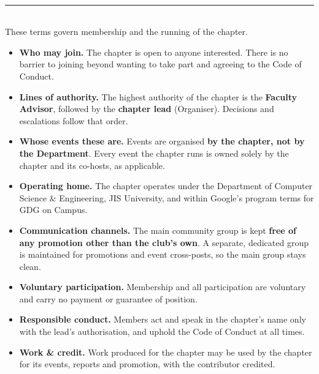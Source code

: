 \documentclass[11pt,a4paper]{article}
\newcommand{\pill}[2]{\tikz[baseline]{\node[fill=#1,text=white,font=\bfseries\small,%
  rounded corners=3pt,inner xsep=7pt,inner ysep=2.5pt]{#2};}}
\begin{document}
\begin{tcolorbox}[enhanced,breakable,colback=white,colframe=Line,boxrule=0.6pt,arc=5pt,
    left=14pt,right=14pt,top=12pt,bottom=12pt,borderline west={3.5pt}{0pt}{GRed},
    before skip=8pt,after skip=12pt]
  {\pill{GRed}{02}}\;\\[8pt]
  {\color{Line}\rule{\linewidth}{0.5pt}}\\[7pt]
  
These terms govern membership and the running of the chapter.
\begin{itemize}[leftmargin=1.4em,itemsep=3pt,topsep=2pt]
  \item \textbf{Who may join.} The chapter is open to anyone interested. There is no barrier to joining
        beyond wanting to take part and agreeing to the Code of Conduct.
  \item \textbf{Lines of authority.} The highest authority of the chapter is the \textbf{Faculty
        Advisor}, followed by the \textbf{chapter lead} (Organiser). Decisions and escalations follow
        that order.
  \item \textbf{Whose events these are.} Events are organised \textbf{by the chapter, not by the
        Department}. Every event the chapter runs is owned solely by the chapter and its co-hosts, as
        applicable.
  \item \textbf{Operating home.} The chapter operates under the Department of Computer Science \&
        Engineering, JIS University, and within Google's program terms for GDG on Campus.
  \item \textbf{Communication channels.} The main community group is kept \textbf{free of any promotion
        other than the club's own}. A separate, dedicated group is maintained for promotions and event
        cross-posts, so the main group stays clean.
  \item \textbf{Voluntary participation.} Membership and all participation are voluntary and carry no
        payment or guarantee of position.
  \item \textbf{Responsible conduct.} Members act and speak in the chapter's name only with the lead's
        authorisation, and uphold the Code of Conduct at all times.
  \item \textbf{Work \& credit.} Work produced for the chapter may be used by the chapter for its
        events, reports and promotion, with the contributor credited.
\end{itemize}
\end{tcolorbox}
\end{document}
